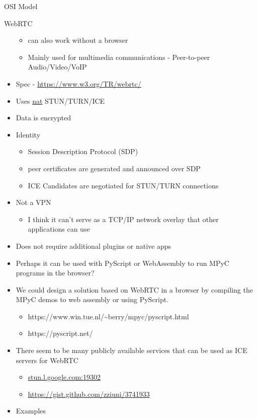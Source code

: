 \begin{frame}[fragile]{OSI Model}
\begin{block}{WebRTC}
\begin{itemize}
  \begin{itemize}
  \tightlist
  \item
    can also work without a browser
  \item
    Mainly used for multimedia communications - Peer-to-peer
    Audio/Video/VoIP
  \end{itemize}
\item
  Spec -
  \href{https://www.w3.org/TR/webrtc/\#persistent-information-exposed-by-webrtc}{https://www.w3.org/TR/webrtc/}
\item
  Uses \href{notes/02021-internet-protocol.md}{nat} STUN/TURN/ICE
\item
  Data is encrypted
\item
  Identity

  \begin{itemize}
  \tightlist
  \item
    Session Description Protocol (SDP)
  \item
    peer certificates are generated and announced over SDP
  \item
    ICE Candidates are negotiated for STUN/TURN connections
  \end{itemize}
\item
  Not a VPN

  \begin{itemize}
  \tightlist
  \item
    I think it can't serve as a TCP/IP network overlay that other
    applications can use
  \end{itemize}
\item
  Does not require additional plugins or native apps
\item
  Perhaps it can be used with PyScript or WebAssembly to run MPyC
  programs in the browser?
\item
  We could design a solution based on WebRTC in a browser by compiling
  the MPyC demos to web assembly or using PyScript.

  \begin{itemize}
  \tightlist
  \item
    https://www.win.tue.nl/\textasciitilde berry/mpyc/pyscript.html
  \item
    https://pyscript.net/
  \end{itemize}
\item
  There seem to be many publicly available services that can be used as
  ICE servers for WebRTC

  \begin{itemize}
  \tightlist
  \item
    \href{http://stun.l.google.com:19302/}{stun.l.google.com:19302}
  \item
    \url{https://gist.github.com/zziuni/3741933}
  \end{itemize}
\item
  Examples


\end{itemize}
\end{block}
\end{frame}
